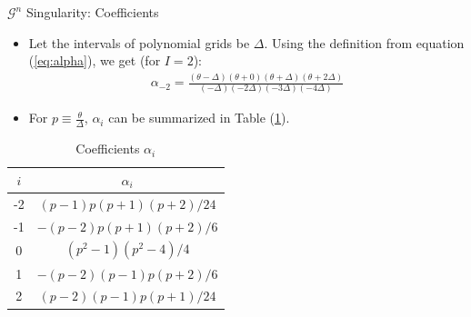 \documentclass[8pt]{beamer}
\begin{document}
\begin{frame}{\color{white} $\mathcal{G}^n$ Singularity: Coefficients}
\begin{itemize}
    \item Let the intervals of polynomial grids be $\Delta$. Using the definition from equation (\ref{eq:alpha}), we get (for $I=2$):
    \begin{align}
         \alpha_{-2} = \frac{(\theta-\Delta)(\theta+0)(\theta+\Delta)(\theta+2\Delta)}{(-\Delta)(-2\Delta)(-3\Delta)(-4\Delta)}
    \end{align}
    \item For $p \equiv \frac{\theta}{\Delta}$, $\alpha_i$ can be summarized in Table (\ref{table:alpha_i}).
\end{itemize}
    \begin{table}[h!]
     \centering
     \caption{Coefficients $\alpha_i$}
     \label{table:alpha_i}
     \begin{tabular}{cc}
     \hline
     $i$ & $\alpha_i$ \\
     \hline
     -2 & $(p-1)p(p+1)(p+2)/24$ \\
     -1 & $-(p-2)p(p+1)(p+2)/6$  \\
     0 & $(p^2-1)(p^2-4)/4$ \\
     1 & $-(p-2)(p-1)p(p+2)/6$ \\
     2 & $(p-2)(p-1)p(p+1)/24$ \\
     \hline
     \end{tabular}
    \end{table}
\end{frame}
\end{document}
